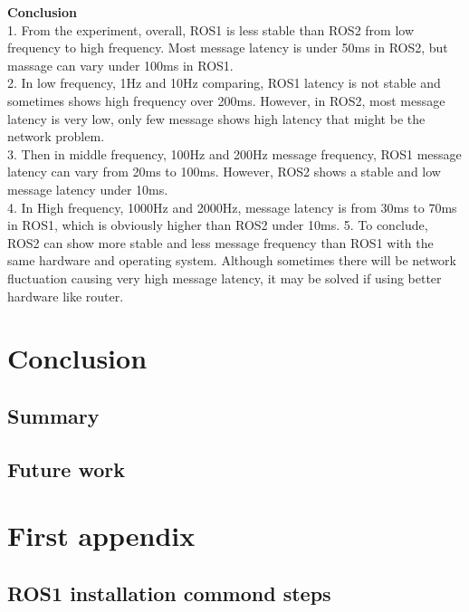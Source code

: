 \documentclass{mproj}
\begin{document}
\textbf{Conclusion} \\
1. From the experiment, overall, ROS1 is less stable than ROS2 from low frequency to high frequency. Most message latency is under 50ms in ROS2, but massage can vary under 100ms in ROS1. \\
2. In low frequency, 1Hz and 10Hz comparing, ROS1 latency is not stable and sometimes shows high frequency over 200ms. However, in ROS2, most message latency is very low, only few message shows high latency that might be the network problem. \\
3. Then in middle frequency, 100Hz and 200Hz message  frequency, ROS1 message latency can vary from 20ms to 100ms. However, ROS2 shows a stable and low message latency under 10ms.\\
4. In High frequency, 1000Hz and 2000Hz, message latency is from 30ms to 70ms in ROS1, which is obviously higher than ROS2 under 10ms.
5. To conclude, ROS2 can show more stable and less message frequency than ROS1 with the same hardware and operating system. Although sometimes there will be network fluctuation causing very high message latency, it may be solved if using better hardware like router.
\chapter{Conclusion}\label{conclusion}
\section{Summary}



\clearpage
\section{Future work}



\appendix %
\chapter{First appendix}

\section{ROS1 installation commond steps}
\end{document}
